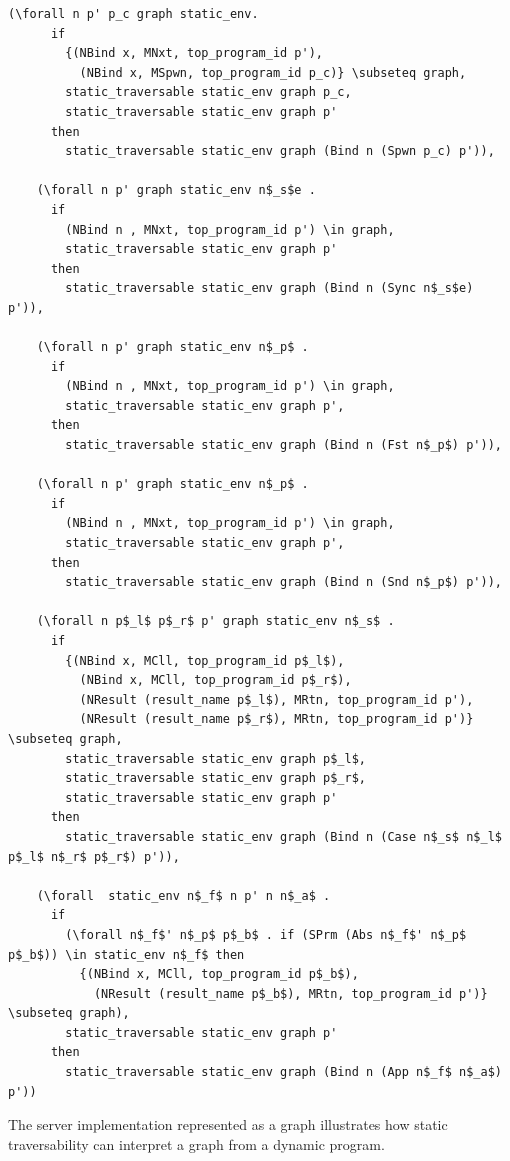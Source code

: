 \documentclass[10pt]{article}
\begin{document}
\begin{lstlisting}[language=logic, mathescape]
    (\forall n p' p_c graph static_env.
      if
        {(NBind x, MNxt, top_program_id p'),
          (NBind x, MSpwn, top_program_id p_c)} \subseteq graph, 
        static_traversable static_env graph p_c, 
        static_traversable static_env graph p'
      then
        static_traversable static_env graph (Bind n (Spwn p_c) p')),

    (\forall n p' graph static_env n$_s$e .
      if
        (NBind n , MNxt, top_program_id p') \in graph, 
        static_traversable static_env graph p'
      then
        static_traversable static_env graph (Bind n (Sync n$_s$e) p')),

    (\forall n p' graph static_env n$_p$ .
      if
        (NBind n , MNxt, top_program_id p') \in graph, 
        static_traversable static_env graph p', 
      then
        static_traversable static_env graph (Bind n (Fst n$_p$) p')),

    (\forall n p' graph static_env n$_p$ .
      if
        (NBind n , MNxt, top_program_id p') \in graph, 
        static_traversable static_env graph p', 
      then
        static_traversable static_env graph (Bind n (Snd n$_p$) p')),

    (\forall n p$_l$ p$_r$ p' graph static_env n$_s$ .
      if
        {(NBind x, MCll, top_program_id p$_l$),
          (NBind x, MCll, top_program_id p$_r$),
          (NResult (result_name p$_l$), MRtn, top_program_id p'),
          (NResult (result_name p$_r$), MRtn, top_program_id p')} \subseteq graph, 
        static_traversable static_env graph p$_l$, 
        static_traversable static_env graph p$_r$,
        static_traversable static_env graph p'
      then
        static_traversable static_env graph (Bind n (Case n$_s$ n$_l$ p$_l$ n$_r$ p$_r$) p')),

    (\forall  static_env n$_f$ n p' n n$_a$ .
      if
        (\forall n$_f$' n$_p$ p$_b$ . if (SPrm (Abs n$_f$' n$_p$ p$_b$)) \in static_env n$_f$ then 
          {(NBind x, MCll, top_program_id p$_b$),
            (NResult (result_name p$_b$), MRtn, top_program_id p')} \subseteq graph),
        static_traversable static_env graph p'
      then
        static_traversable static_env graph (Bind n (App n$_f$ n$_a$) p'))
  \end{lstlisting}

The server implementation represented as a graph illustrates how static traversability can interpret
a graph from a dynamic program.
\end{document}
